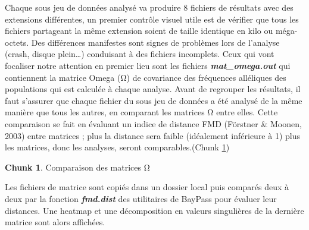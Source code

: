 \documentclass[
  openany]{book}
\theoremstyle{definition}
\theoremstyle{definition}
\theoremstyle{definition}
\newtheorem{exercise}{Chunk}[chapter]
\theoremstyle{definition}
\theoremstyle{remark}
\begin{document}
Chaque sous jeu de données analysé va produire 8 fichiers de résultats avec des extensions différentes, un premier contrôle visuel utile est de vérifier que tous les fichiers partageant la même extension soient de taille identique en kilo ou méga-octets. Des différences manifestes sont signes de problèmes lors de l'analyse (crash, disque plein\ldots) conduisant à des fichiers incomplets. Ceux qui vont focaliser notre attention en premier lieu sont les fichiers \textbf{\emph{mat\_omega.out}} qui contiennent la matrice Omega (Ω) de covariance des fréquences alléliques des populations qui est calculée à chaque analyse. Avant de regrouper les résultats, il faut s'assurer que chaque fichier du sous jeu de données a été analysé de la même manière que tous les autres, en comparant les matrices Ω entre elles.
Cette comparaison se fait en évaluant un indice de distance FMD (Förstner \& Moonen, 2003) entre matrices ; plus la distance sera faible (idéalement inférieure à 1) plus les matrices, donc les analyses, seront comparables.(Chunk \ref{exr:chunk5})

\begin{exercise}
\protect\hypertarget{exr:chunk5}{}\label{exr:chunk5}{Comparaison des matrices Ω}
\end{exercise}

Les fichiers de matrice sont copiés dans un dossier local puis comparés deux à deux par la fonction \textbf{\emph{fmd.dist}} des utilitaires de BayPass pour évaluer leur distances.
Une heatmap et une décomposition en valeurs singulières de la dernière matrice sont alors affichées.
\end{document}
